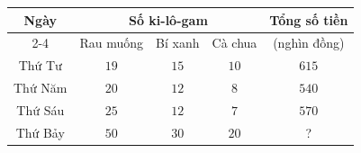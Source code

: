 \documentclass[tikz,border=3mm]{standalone}
\begin{document}
\begin{minipage}{0.98\linewidth}
\centering
\begin{tabular}{|c|c|c|c|c|}
			\hline
			\multirow{2}{*}{Ngày} & \multicolumn{3}{c|}{Số ki-lô-gam} & \multirow{2}{*}{Tổng số tiền} \\ \cline{2-4}
			& Rau muống & Bí xanh & Cà chua & (nghìn đồng) \\ \hline
			Thứ Tư & $19$ & $15$ & $10$ & $615$ \\ \hline
			Thứ Năm & $20$ & $12$ & $8$ & $540$ \\ \hline
			Thứ Sáu & $25$ & $12$ & $7$ & $570$ \\ \hline
			Thứ Bảy & $50$ & $30$ & $20$ & ? \\ \hline
		\end{tabular}
\end{minipage}
\end{document}
